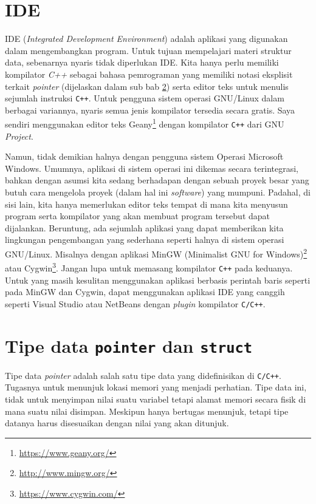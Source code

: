 \section{IDE}
IDE (\textit{Integrated Development Environment}) adalah aplikasi yang digunakan dalam mengembangkan program. Untuk tujuan mempelajari materi struktur data, sebenarnya nyaris tidak diperlukan IDE. Kita hanya perlu memiliki kompilator \textit{C++} sebagai bahasa pemrograman yang memiliki notasi eksplisit terkait \textit{pointer} (dijelaskan dalam sub bab \ref{sec:pointer}) serta editor teks untuk menulis sejumlah instruksi \texttt{C++}. Untuk pengguna sistem operasi GNU/Linux dalam berbagai variannya, nyaris semua jenis kompilator tersedia secara gratis. Saya sendiri menggunakan editor teks Geany\footnote{\url{https://www.geany.org/}} dengan kompilator \texttt{C++} dari GNU \textit{Project}.

Namun, tidak demikian halnya dengan pengguna sistem Operasi Microsoft Windows. Umumnya, aplikasi di sistem operasi ini dikemas secara terintegrasi, bahkan dengan asumsi kita sedang berhadapan dengan sebuah proyek besar yang butuh cara mengelola proyek (dalam hal ini \textit{software}) yang mumpuni. Padahal, di sisi lain, kita hanya memerlukan editor teks tempat di mana kita menyusun program serta kompilator yang akan membuat program tersebut dapat dijalankan. Beruntung, ada sejumlah aplikasi yang dapat memberikan kita lingkungan pengembangan yang sederhana seperti halnya di sistem operasi GNU/Linux. Misalnya dengan aplikasi MinGW (Minimalist GNU for Windows)\footnote{\url{http://www.mingw.org/}} atau Cygwin\footnote{\url{https://www.cygwin.com/}}. Jangan lupa untuk memasang kompilator \texttt{C++} pada keduanya. Untuk yang masih kesulitan menggunakan aplikasi berbasis perintah baris seperti pada MinGW dan Cygwin, dapat menggunakan aplikasi IDE yang canggih seperti Visual Studio atau NetBeans dengan \textit{plugin} kompilator \texttt{C/C++}.

\section{Tipe data \texttt{pointer} dan \texttt{struct}}
\label{sec:pointer}
Tipe data \textit{pointer} adalah salah satu tipe data yang didefinisikan di \texttt{C/C++}. Tugasnya untuk menunjuk lokasi memori yang menjadi perhatian. Tipe data ini, tidak untuk menyimpan nilai suatu variabel tetapi alamat memori secara fisik di mana suatu nilai disimpan. Meskipun hanya bertugas menunjuk, tetapi tipe datanya harus disesuaikan dengan nilai yang akan ditunjuk. 

